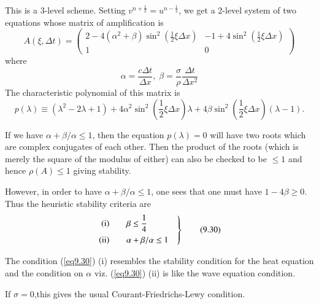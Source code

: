 This is a 3-level scheme. Setting $v^{n+\frac{1}{2}} = u^{n-\frac{1}{2}}$, we get a 2-level system of two equations whose matrix of amplification is 
\begin{equation*}
A (\xi , \Delta t) = 
\begin{pmatrix}
2- 4 (\alpha^2 + \beta) \sin^2 (\frac{1}{2} \xi \Delta x) & -1+4
\sin^2 (\frac{1}{2} \xi \Delta x)\\
1 & 0
\end{pmatrix}
\tag{9.28}\label{eq9.28}
\end{equation*}
where 
\begin{equation*}
\alpha = \frac{c\Delta t}{\Delta x}, \; \beta = \frac{\sigma}{\rho} \frac{\Delta t}{\Delta x^2}\tag{9.29}\label{eq9.29}
\end{equation*}
The characteristic polynomial of this matrix is 
$$
p(\lambda) \equiv (\lambda^2 - 2 \lambda +1) + 4 \alpha^2 \sin^2
\left(\frac{1}{2} \xi \Delta x\right) \lambda + 4 \beta \sin^2
\left(\frac{1}{2} \xi \Delta x\right) (\lambda -1). 
$$

If we have $\alpha + \beta/\alpha \leq 1$, then the equation $p(\lambda) =0$ will have two roots which are complex conjugates of each other. Then the product of the roots (which is merely the square of the modulus of either) can also be checked to be $\leq 1$ and hence $\rho (A) \leq 1$ giving stability. 

However, in order to have $\alpha + \beta/\alpha \leq 1$, one sees that one must have $1-4 \beta \geq 0$. Thus the heuristic stability criteria are
\begin{equation*}
\left. 
\begin{aligned}
{\rm (i)} & \qquad  \beta \leq \frac{1}{4} \quad \\
{\rm (ii)} & \qquad \alpha + \beta / \alpha \leq 1 \quad \\
\end{aligned}
\right\}
\tag{9.30}\label{eq9.30}
\end{equation*}

\begin{remark}\label{chap9:rem9.2}
The condition (\ref{eq9.30}) (i) resembles the stability condition for the heat equation and the condition on $\alpha$ viz. (\ref{eq9.30}) (ii) is like the wave equation condition.
\end{remark}

\begin{remark}\label{chap9:rem9.3}
If $\sigma =0$,\pageoriginale this gives the usual Courant-Friedrichs-Lewy condition.
\end{remark}

